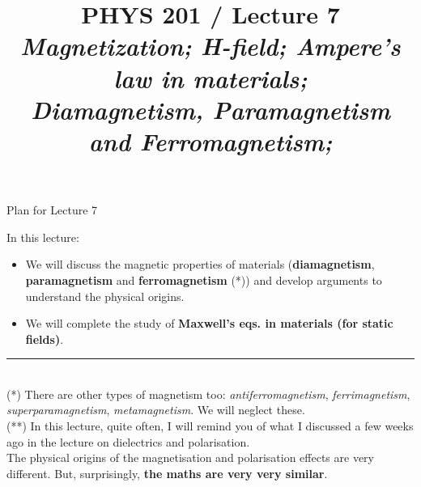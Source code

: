 \renewcommand{\prevlecture}{6 }
\renewcommand{\thislecture}{7 }
\renewcommand{\nextlecture}{8 }

%
%

\title[PHYS 201 / Lecture \thislecture]
{
  PHYS 201 / Lecture \thislecture\\
  {\it
       Magnetization; H-field; Ampere's law in materials;\\
       Diamagnetism, Paramagnetism and Ferromagnetism;
  }\\
}



\begin{frame}[plain]
  \titlepage
\end{frame}


%
%

\renewcommand{\lecturesummarytitle}{Revision }


%
%

\begin{frame}{Plan for Lecture \thislecture}

In this lecture:
\begin{itemize}
   \item We will discuss the magnetic properties of materials
             ({\bf diamagnetism}, {\bf paramagnetism} and {\bf ferromagnetism} (*))
             and develop arguments to understand the physical origins.
   \item We will complete the study of {\bf Maxwell's eqs. in materials (for static fields)}.
\end{itemize}

\vspace{0.1cm}

\noindent\rule{2cm}{0.4pt}\\
{\small
 (*) There are other types of magnetism too:
 {\em antiferromagnetism}, {\em ferrimagnetism}, {\em superparamagnetism},
 {\em metamagnetism}. We will neglect these.\\
 (**) In this lecture, quite often, I will remind you of what I discussed a few
       weeks ago in the lecture on dielectrics and polarisation.\\
       The physical origins of the magnetisation and polarisation effects are
       very different. But, surprisingly, {\bf the maths are very very similar}.
}
\end{frame}

